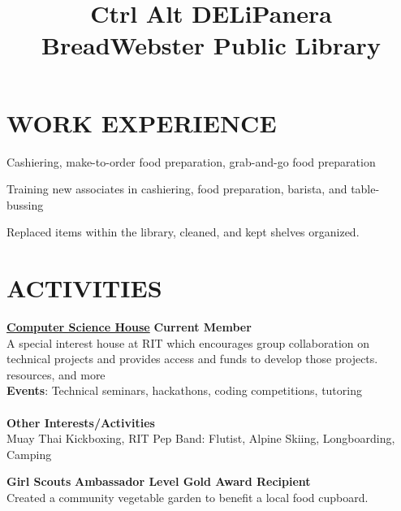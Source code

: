 \documentclass[line,margin]{res}
\begin{document}
\begin{resume}
\section{WORK EXPERIENCE}
\title{\textbf{Ctrl Alt DELi}}
\begin{position}
    Cashiering, make-to-order food preparation, grab-and-go food preparation
\end{position}
\title{\textbf{Panera Bread}}
\begin{position}
    Training new associates in cashiering, food preparation, barista, and table-bussing
\end{position}
\title{\textbf{Webster Public Library}}
\begin{position}
    Replaced items within the library, cleaned, and kept shelves organized.
\end{position}

\section{ACTIVITIES}
\href{https://csh.rit.edu}{\textbf{Computer Science House}}
\hfill
\textbf{Current Member}\\
A special interest house at RIT which encourages group collaboration on technical 
projects and provides access and funds to develop those projects.
resources, and more\\
\textbf{Events}: 
Technical seminars, hackathons, coding competitions, tutoring\\
\\\textbf{Other Interests/Activities}\\
Muay Thai Kickboxing, RIT Pep Band: Flutist, Alpine Skiing, Longboarding, Camping

\textbf{Girl Scouts} \hfill \textbf{Ambassador Level Gold Award Recipient}\\
Created a community vegetable garden to benefit a local food cupboard.

\end{resume}


\makebox[0pt][l]{}%
\makebox[\textwidth][c]{}%
\end{document}
